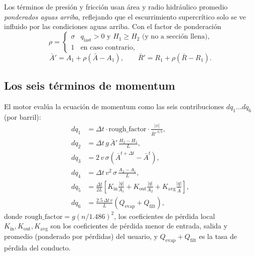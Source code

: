 \documentclass[11pt,a4paper]{article}
\begin{document}
Los términos de presión y fricción usan área y radio hidráulico promedio
\emph{ponderados aguas arriba}, reflejando que el escurrimiento supercrítico
solo se ve influido por las condiciones aguas arriba. Con el factor de
ponderación
\begin{equation}
  \rho = \begin{cases} \sigma & q_{\mathrm{last}} > 0 \text{ y } H_1 \ge H_2
    \text{ (y no a sección llena),}\\ 1 & \text{en caso contrario,}\end{cases}
\end{equation}
\begin{equation}
  \bar A' = A_1 + \rho\left(\bar A - A_1\right),
  \qquad
  \bar R' = R_1 + \rho\left(\bar R - R_1\right).
\end{equation}

\subsection{Los seis términos de momentum}

El motor evalúa la ecuación de momentum como las seis contribuciones
$dq_1 \ldots dq_6$ (por barril):
\begin{align}
  dq_1 &= \Delta t \cdot \mathrm{rough\_factor} \cdot
        \frac{\lvert v \rvert}{\bar R'^{\,4/3}}, \label{eq:dq1}\\
  dq_2 &= \Delta t\, g\, \bar A'\, \frac{H_2 - H_1}{L}, \label{eq:dq2}\\
  dq_3 &= 2\,v\,\sigma\left(\bar A^{t+\Delta t} - \bar A^{t}\right), \label{eq:dq3}\\
  dq_4 &= \Delta t\, v^{2}\, \sigma\,\frac{A_2 - A_1}{L}, \label{eq:dq4}\\
  dq_5 &= \frac{\Delta t}{2L}
          \left[ K_{\mathrm{in}}\frac{\lvert q \rvert}{A_1} +
                K_{\mathrm{out}}\frac{\lvert q \rvert}{A_2} +
                K_{\mathrm{avg}}\frac{\lvert q \rvert}{\bar A} \right], \label{eq:dq5}\\
  dq_6 &= \frac{2.5\,\Delta t\, v}{L}\left(Q_{\mathrm{evap}} +
          Q_{\mathrm{filt}}\right), \label{eq:dq6}
\end{align}
donde $\mathrm{rough\_factor} = g(n/1.486)^2$, los coeficientes de pérdida
local $K_{\mathrm{in}}, K_{\mathrm{out}}, K_{\mathrm{avg}}$ son los
coeficientes de pérdida menor de entrada, salida y promedio (ponderado por
pérdidas) del usuario, y $Q_{\mathrm{evap}} + Q_{\mathrm{filt}}$ es la tasa de
pérdida del conducto.
\end{document}
